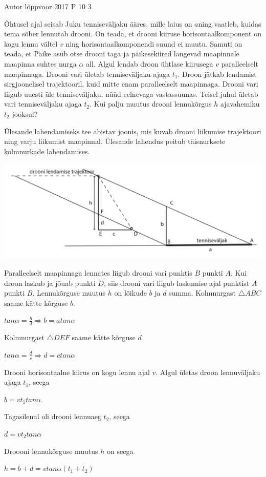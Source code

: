 {Autor} %
{lõppvoor} %
{2017} %
{P 10} %
{3} %
{

\ifStatement
Õhtusel ajal seisab Juku tenniseväljaku ääres, mille laius on $a $ning vaatleb, kuidas tema sõber lennutab drooni. On teada, et drooni kiiruse horisontaalkomponent on kogu lennu vältel $v$ ning horisontaalkomponendi suund ei muutu. Samuti on teada, et Päike asub otse drooni taga ja päikesekiired langevad maapinnale maapinna suhtes nurga $\alpha$ all. Algul lendab droon ühtlase kiirusega $v$ paralleelselt maapinnaga. Drooni vari ületab tenniseväljaku ajaga $t_1$. Droon jätkab lendamist sirgjoonelisel trajektooril, kuid mitte enam paralleelselt maapinnaga. Drooni vari liigub uuesti üle tenniseväljaku, nüüd eelnevaga vastassuunas. Teisel juhul ületab vari tenniseväljaku ajaga $t_2$. Kui palju muutus drooni lennukõrgus $h$ ajavahemiku $t_2$ jooksul?
\fi

\ifHint
Ülesande lahendamiseks tee abistav joonis, mis kuvab drooni liikumise trajektoori ning varju liikumist maapinnal. Ülesande lahendus peitub täisnurksete kolmnurkade lahendamises.
\fi

\ifSolution
\begin{center}
	\includegraphics[width=0.5\linewidth]{2017-v3p-10-lah.PNG}
\end{center}
Paralleelselt maapinnaga lennates liigub drooni vari punktis $B$ punkti $A$. Kui droon laskub ja jõuab punkti $D$, siis drooni vari liigub laskumise ajal punktist $A$ punkti $B$.
Lennukõrguse muutus $h$ on lõikude $b$ ja $d$ summa. Kolmnurgast $\triangle ABC$  saame kätte kõrguse $b$.
\begin{center}
$tan\alpha = \frac{b}{d} \Rightarrow b = atan\alpha$
\end{center}
Kolmnurgast $\triangle DEF$ saame kätte kõrguse $d$
\begin{center}
$tan\alpha = \frac{d}{c} \Rightarrow d=ctan\alpha$
\end{center}
Drooni horisontaalne kiirus on kogu lennu ajal $v$. Algul ületas droon lennuväljaku ajaga $t_1$, seega 
\begin{center}
$b = vt_1 tan\alpha$. 
\end{center}
Tagasilenul oli drooni lennuaeg $t_2$, seega 
\begin{center}
$d = vt_2tan\alpha$
\end{center}
Droooni lennukõrguse muutus $h$ on seega 
\begin{center}
$h = b + d = vtan\alpha (t_1 + t_2) $
\end{center}
\fi
}